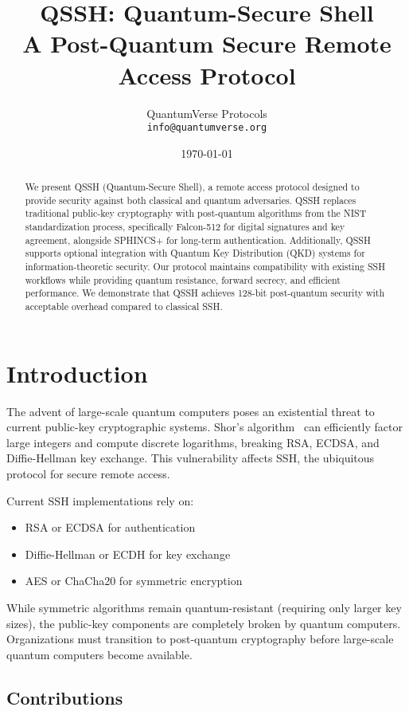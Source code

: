 \documentclass[11pt,a4paper]{article}
\title{QSSH: Quantum-Secure Shell\\
\large A Post-Quantum Secure Remote Access Protocol}
\author{
QuantumVerse Protocols\\
\texttt{info@quantumverse.org}
}
\date{\today}
\begin{document}
\maketitle

\begin{abstract}
We present QSSH (Quantum-Secure Shell), a remote access protocol designed to provide security against both classical and quantum adversaries. QSSH replaces traditional public-key cryptography with post-quantum algorithms from the NIST standardization process, specifically Falcon-512 for digital signatures and key agreement, alongside SPHINCS+ for long-term authentication. Additionally, QSSH supports optional integration with Quantum Key Distribution (QKD) systems for information-theoretic security. Our protocol maintains compatibility with existing SSH workflows while providing quantum resistance, forward secrecy, and efficient performance. We demonstrate that QSSH achieves 128-bit post-quantum security with acceptable overhead compared to classical SSH.
\end{abstract}

\section{Introduction}

The advent of large-scale quantum computers poses an existential threat to current public-key cryptographic systems. Shor's algorithm~\cite{shor1994} can efficiently factor large integers and compute discrete logarithms, breaking RSA, ECDSA, and Diffie-Hellman key exchange. This vulnerability affects SSH, the ubiquitous protocol for secure remote access.

Current SSH implementations rely on:
\begin{itemize}
    \item RSA or ECDSA for authentication
    \item Diffie-Hellman or ECDH for key exchange
    \item AES or ChaCha20 for symmetric encryption
\end{itemize}

While symmetric algorithms remain quantum-resistant (requiring only larger key sizes), the public-key components are completely broken by quantum computers. Organizations must transition to post-quantum cryptography before large-scale quantum computers become available.

\subsection{Contributions}
\end{document}
